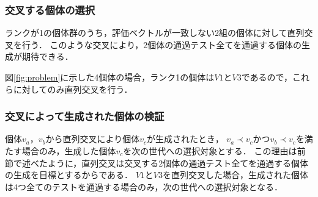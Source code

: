 \documentclass[uplatex,dvipdfmx,a4paper]{jsarticle}
\let\oldcite\cite
\renewcommand{\cite}[1]{\xspace\oldcite{#1}}
\begin{document}


\subsubsection{交叉する個体の選択}
ランクが1の個体群のうち，評価ベクトルが一致しない2組の個体に対して直列交叉を行う．
このような交叉により，2個体の通過テスト全てを通過する個体の生成が期待できる．

図\ref{fig:problem}に示した4個体の場合，ランク1の個体は$V1$と$V3$であるので，これらに対してのみ直列交叉を行う．



\subsubsection{交叉によって生成された個体の検証}
個体$v_a$，$v_b$から直列交叉により個体$v_c$が生成されたとき，
$v_a \prec v_c$かつ$v_b \prec v_c$を満たす場合のみ，生成した個体$v_c$を次の世代への選択対象とする．
この理由は前節で述べたように，直列交叉は交叉する2個体の通過テスト全てを通過する個体の生成を目標とするからである．
$V1$と$V3$を直列交叉した場合，生成された個体は4つ全てのテストを通過する場合のみ，次の世代への選択対象となる．



\end{document}
